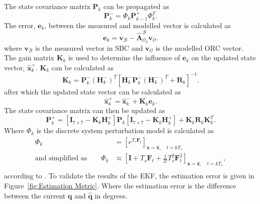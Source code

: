The state covariance matrix $\mathbf{P}_k$ can be propagated as
\begin{equation}
	\mathbf{P}_k^- = \Phi_k \mathbf{P}_{k-1}^+ \Phi_k ^T.
	\label{eq:P_k}
\end{equation}
The error, $\mathbf{e}_k$, between the measured and modelled vector is calculated as
\begin{equation}
	\mathbf{e}_k = \mathbf{v}_\mathcal{B} - \boldsymbol{\hat{A}}^{\mathcal{B}}_{\mathcal{O}_k} \mathbf{v}_\mathcal{O}.
	\label{eq:errorVector}
\end{equation}
where $\mathbf{v}_\mathcal{B}$ is the measured vector in SBC and $\mathbf{v}_\mathcal{O}$ is the modelled ORC vector. The gain matrix $\mathbf{K}_k$ is used to determine the influence of $\mathbf{e}_k$ on the updated state vector, $\hat{\mathbf{x}}_k^+$. $\mathbf{K}_k$ can be calculated as 
\begin{equation}
	\mathbf{K}_k = \mathbf{P}_k^- (\mathbf{H}_k^-)^T \left[\mathbf{H}_k^- \mathbf{P}_k^- (\mathbf{H}_k^-)^T + \mathbf{R}_k \right]^{-1}.
\end{equation}
after which the updated state vector can be calculated as
\begin{equation}
	\hat{\mathbf{x}}_k^+ = \hat{\mathbf{x}}_k^- + \mathbf{K}_k \mathbf{e}_k.
	\label{eq:UpdatedStateVector}
\end{equation}
The state covariance matrix can then be updated as
\begin{equation}
	\mathbf{P}_k^+ = \left[\mathbf{I}_{7 \times 7} - \mathbf{K}_k \mathbf{H}_k^+ \right]\mathbf{P}_k \left[\mathbf{I}_{7 \times 7} - \mathbf{K}_k \mathbf{H}_k^+ \right] + \mathbf{K}_k \mathbf{R}_k \mathbf{K}_k^T.
	\label{eq:Updated_P_k}
\end{equation}
Where $\Phi_k$ is the discrete system perturbation model is calculated as
\begin{equation}
	\begin{aligned}
		\Phi_k &= \left[e^{T_s\mathbf{F}_t}\right]_{\mathbf{x}=\mathbf{\hat{x}},\quad t = kT_s} \\
		\text{and simplified as} \qquad \Phi_k &\approx \left[\mathbf{I} + T_s\mathbf{F}_t + \frac{1}{2!}T_s^2\mathbf{F}_t^2\right]_{\mathbf{x}=\mathbf{\hat{x}},\quad t = kT_s}, \\
	\end{aligned}
\end{equation}
according to \cite{Steyn2004Notes}. To validate the results of the EKF, the estimation error is given in Figure~\ref{fig:Estimation Metric}. Where the estimation error is the difference between the current $\mathbf{q}$ and $\mathbf{\hat{q}}$ in degrees.


